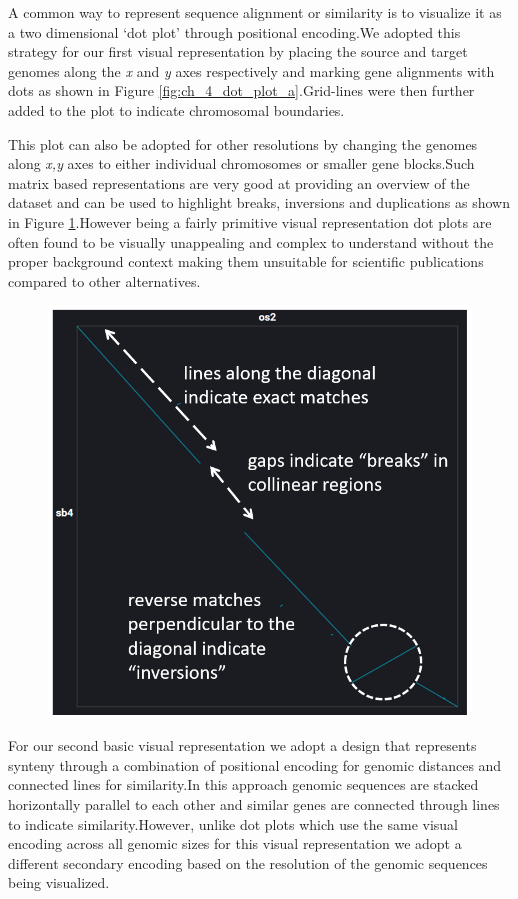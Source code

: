 A common way to represent sequence alignment or similarity is to visualize it as a two dimensional `dot plot' \cite{SONNHAMMER1995GC1,Cabanettes2018} through positional encoding.We adopted this strategy for our first visual representation by placing the source and target genomes along the \textit{x} and \textit{y} axes respectively and marking gene alignments with dots as shown in Figure \ref{fig:ch_4_dot_plot_a}.Grid-lines were then further added to the plot to indicate chromosomal boundaries.



This plot can also be adopted for other resolutions by changing the genomes along \textit{x,y} axes to either individual chromosomes or smaller gene blocks.Such matrix based representations are very good at providing an overview of the dataset and can be used to highlight breaks, inversions and duplications as shown in Figure \ref{fig:ch_4_dot_plot_b}.However being a fairly primitive visual representation dot plots are often found to be visually unappealing and complex to understand without the proper background context making them unsuitable for scientific publications compared to other alternatives.


\begin{figure}
  \centering
  \includegraphics[width=.475\linewidth]{images/ch_4_dot_plot_b.PNG}
  \label{fig:ch_4_dot_plot_b}
\end{figure}


For our second basic visual representation we adopt a design that represents synteny through a combination of positional encoding for genomic distances and connected lines for similarity.In this approach genomic sequences are stacked horizontally parallel to each other and similar genes are connected through lines to indicate similarity.However, unlike dot plots which use the same visual encoding across all genomic sizes for this visual representation we adopt a different secondary encoding based on the resolution of the genomic sequences being visualized. 

